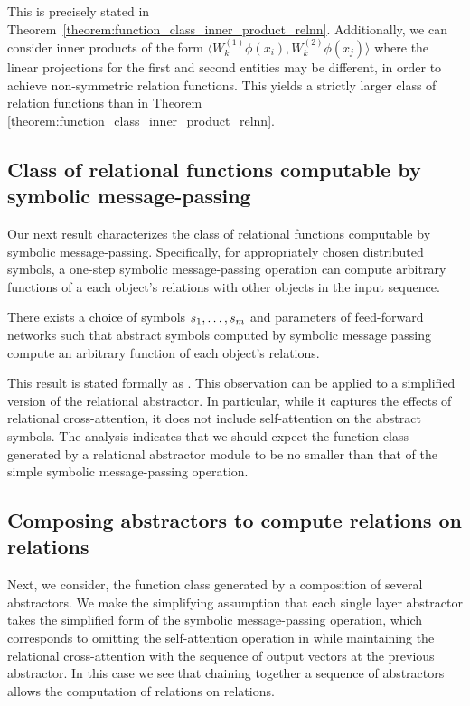 This is precisely stated in Theorem~\ref{theorem:function_class_inner_product_relnn}. 
Additionally, we can consider inner products of the form
$\langle W_k^{(1)} \phi(x_i), W_k^{(2)} \phi(x_j) \rangle$
where the linear projections for the first and second entities may be different, in order to achieve non-symmetric relation functions. This yields a strictly larger class of relation functions than in Theorem \ref{theorem:function_class_inner_product_relnn}.

\subsection{Class of relational functions computable by symbolic message-passing}

Our next result characterizes the class of relational functions computable by symbolic message-passing.
Specifically, for appropriately chosen distributed symbols, 
a one-step symbolic message-passing operation can compute arbitrary functions of a each object's relations with other objects in the input sequence. 

\begin{result}
    There exists a choice of symbols \(s_1, \ldots, s _m\) and parameters of feed-forward networks such that abstract symbols computed by symbolic message passing compute an arbitrary function of each object's relations.
\end{result}

This result is stated formally as .
This observation can be applied to a simplified version of the relational abstractor. In particular, while it captures the effects of relational cross-attention, it does not include self-attention on the abstract symbols. The analysis indicates that we should expect the function class generated by a relational  abstractor module to be no smaller than that of the simple symbolic message-passing operation.


\subsection{Composing  abstractors to compute relations on relations}
\label{ssec:compsing_abstractors_preview}

Next, we consider, 
the function class generated by a composition of several abstractors. We make the simplifying assumption that each single layer abstractor takes the simplified form of the symbolic message-passing operation, which corresponds to omitting the self-attention operation in  while maintaining the relational cross-attention with the sequence of output vectors at the previous  abstractor. In this case 
we see that chaining together a sequence of  abstractors allows the computation of relations on relations.

